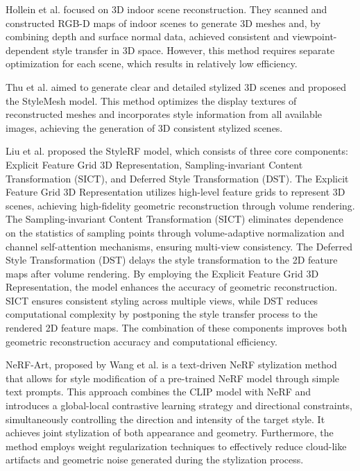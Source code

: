 \documentclass[preprint,12pt]{elsarticle}
\begin{document}
Hollein et al.\citep{86hollein2022stylemesh} focused on 3D indoor scene reconstruction. They scanned and constructed RGB-D maps of indoor scenes to generate 3D meshes and, by combining depth and surface normal data, achieved consistent and viewpoint-dependent style transfer in 3D space. However, this method requires separate optimization for each scene, which results in relatively low efficiency.

Thu et al.\citep{91nguyen2022snerf} aimed to generate clear and detailed stylized 3D scenes and proposed the StyleMesh model. This method optimizes the display textures of reconstructed meshes and incorporates style information from all available images, achieving the generation of 3D consistent stylized scenes.

Liu et al.\citep{82liu2023stylerf} proposed the StyleRF model, which consists of three core components: Explicit Feature Grid 3D Representation, Sampling-invariant Content Transformation (SICT), and Deferred Style Transformation (DST). The Explicit Feature Grid 3D Representation utilizes high-level feature grids to represent 3D scenes, achieving high-fidelity geometric reconstruction through volume rendering. The Sampling-invariant Content Transformation (SICT) eliminates dependence on the statistics of sampling points through volume-adaptive normalization and channel self-attention mechanisms, ensuring multi-view consistency. The Deferred Style Transformation (DST) delays the style transformation to the 2D feature maps after volume rendering. By employing the Explicit Feature Grid 3D Representation, the model enhances the accuracy of geometric reconstruction. SICT ensures consistent styling across multiple views, while DST reduces computational complexity by postponing the style transfer process to the rendered 2D feature maps. The combination of these components improves both geometric reconstruction accuracy and computational efficiency.

NeRF-Art, proposed by Wang et al.\citep{94wang2023nerf}  is a text-driven NeRF stylization method that allows for style modification of a pre-trained NeRF model through simple text prompts. This approach combines the CLIP model with NeRF and introduces a global-local contrastive learning strategy and directional constraints, simultaneously controlling the direction and intensity of the target style. It achieves joint stylization of both appearance and geometry. Furthermore, the method employs weight regularization techniques to effectively reduce cloud-like artifacts and geometric noise generated during the stylization process.
\end{document}
